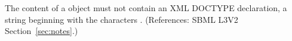 The content of a \Notes object must not contain an XML
DOCTYPE declaration, \ie a string beginning with the characters
.  (References: SBML L3V2 Section~\ref{sec:notes}.)
